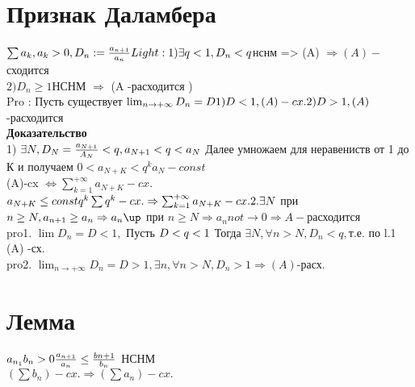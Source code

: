 \documentclass[12pt, a4paper]{article}
\begin{document}
        \section{Признак Даламбера}
        $ \sum a_k , a_k > 0, D_n := \frac{a_{n+1}}{a_n}\\
        Light: 1) \exists q<1, D_n < q  $нснм => (A) $  \Rightarrow (A)- $сходится \\
                $ 2) D_n \geq 1  $НСНМ $\Rightarrow$ (A -расходится )\\
        Pro : Пусть существует $ \lim_{n \rightarrow +\infty} D_n =D \\
        1)  D < 1 , (A) -cx. \\
        2) D >1 , (A) $-расходится \\
        \textbf{Доказательство} \\
        1) $ \exists N, D_N =\frac{a_{N+1}}{A_N} < q,
        \\ a_{N+1} < q< a_N $ Далее умножаем  для неравениств от 1 до К и получаем $0<a_{N+K} < q^k  a_N - const$\\
        (A)-cx $ \Leftrightarrow \sum_{k=1}^{+\infty} a_{N+K}- cx. $\\
        $ a_{N+K} \leq const q^k \\
        \sum q^k -cx. \Rightarrow \sum_{k=1}^{+\infty} a_{N+K}- cx. \\
        2. \exists N  $ при $ n \geq N, a_{n+1} \geq a_n \\
        \Rightarrow a_n \up  $ при $ n \geq N \Rightarrow a_n  not \rightarrow 0 \Rightarrow A- $расходится \\
        
        pro1. $ \lim D_n= D < 1 , $ Пусть $ D< q < 1 \\ $
        Тогда $ \exists N, \forall n > N , D_n < q,  $т.е. по l.1  (A) -сх. \\
        pro2. $ \lim_{n \rightarrow +\infty}D_n =D > 1,  \exists n , \forall n  > N, D_n > 1 \Rightarrow(A) $-расх.\\
        
        \section{Лемма}
        $ a_{n_1} b_n>0 \\
        \frac{a_{n+1}}{a_n} \leq \frac{b{n+1}}{b_n}$ НСНМ \\
        $ (\sum b_n) -cx. \Rightarrow (\sum a_n )- cx. $\\
        
\end{document}
